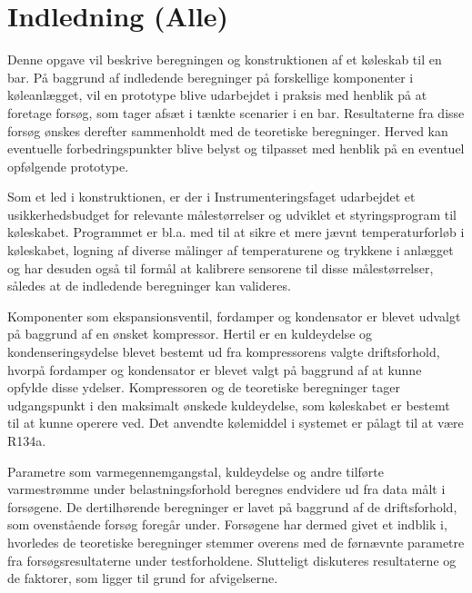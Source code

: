 \documentclass[../Hovedrapport.tex]{subfiles}
\begin{document}
\chapter{Indledning (Alle)}       %
    \label{chap:indledning}
    \vspace{-30pt}
Denne opgave vil beskrive beregningen og konstruktionen af et køleskab til en bar. På baggrund af indledende beregninger på forskellige komponenter i køleanlægget, vil en prototype blive udarbejdet i praksis med henblik på at foretage forsøg, som tager afsæt i tænkte scenarier i en bar. Resultaterne fra disse forsøg ønskes derefter sammenholdt med de teoretiske beregninger. Herved kan eventuelle forbedringspunkter blive belyst og tilpasset med henblik på en eventuel opfølgende prototype. 

Som et led i konstruktionen, er der i Instrumenteringsfaget udarbejdet et usikkerhedsbudget for relevante målestørrelser og udviklet et styringsprogram til køleskabet. Programmet er bl.a. med til at sikre et mere jævnt temperaturforløb i køleskabet, logning af diverse målinger af temperaturene og trykkene i anlægget og har desuden også til formål at kalibrere sensorene til disse målestørrelser, således at de indledende beregninger kan valideres.

Komponenter som ekspansionsventil, fordamper og kondensator er blevet udvalgt på baggrund af en ønsket kompressor. Hertil er en kuldeydelse og kondenseringsydelse blevet bestemt ud fra kompressorens valgte driftsforhold, hvorpå fordamper og kondensator er blevet valgt på baggrund af at kunne opfylde disse ydelser. Kompressoren og de teoretiske beregninger tager udgangspunkt i den maksimalt ønskede kuldeydelse, som køleskabet er bestemt til at kunne operere ved. Det anvendte kølemiddel i systemet er pålagt til at være R134a. 

Parametre som varmegennemgangstal, kuldeydelse og andre tilførte varmestrømme under belastningsforhold beregnes endvidere ud fra data målt i forsøgene. De dertilhørende beregninger er lavet på baggrund af de driftsforhold, som ovenstående forsøg foregår under. Forsøgene har dermed givet et indblik i, hvorledes de teoretiske beregninger stemmer overens med de førnævnte parametre fra forsøgsresultaterne under testforholdene. Slutteligt diskuteres resultaterne og de faktorer, som ligger til grund for afvigelserne.
\clearpage
\end{document}
